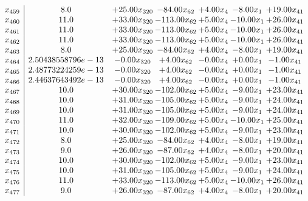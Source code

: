 \documentclass[8pt]{article}
\begin{document}
\[\begin{array}{c| c c@{\hskip 2pt} c@{\hskip 2pt} c@{\hskip 2pt} c@{\hskip 2pt} c@{\hskip 2pt} }
 x_{459}   &  8.0 & + 25.00 x_{320} & -84.00 x_{62} & +  4.00 x_{4} & -8.00 x_{1} & + 19.00 x_{41}\\
 x_{460}   &  11.0 & + 33.00 x_{320} & -113.00 x_{62} & +  5.00 x_{4} & -10.00 x_{1} & + 26.00 x_{41}\\
 x_{461}   &  11.0 & + 33.00 x_{320} & -113.00 x_{62} & +  5.00 x_{4} & -10.00 x_{1} & + 26.00 x_{41}\\
 x_{462}   &  11.0 & + 33.00 x_{320} & -113.00 x_{62} & +  5.00 x_{4} & -10.00 x_{1} & + 26.00 x_{41}\\
 x_{463}   &  8.0 & + 25.00 x_{320} & -84.00 x_{62} & +  4.00 x_{4} & -8.00 x_{1} & + 19.00 x_{41}\\
 x_{464}   &  2.50438558796e-13 & -0.00 x_{320} & +  4.00 x_{62} & -0.00 x_{4} & +  0.00 x_{1} & -1.00 x_{41}\\
 x_{465}   &  2.48773224259e-13 & -0.00 x_{320} & +  4.00 x_{62} & -0.00 x_{4} & +  0.00 x_{1} & -1.00 x_{41}\\
 x_{466}   &  2.44637643492e-13 & -0.00 x_{320} & +  4.00 x_{62} & -0.00 x_{4} & +  0.00 x_{1} & -1.00 x_{41}\\
 x_{467}   &  10.0 & + 30.00 x_{320} & -102.00 x_{62} & +  5.00 x_{4} & -9.00 x_{1} & + 23.00 x_{41}\\
 x_{468}   &  10.0 & + 31.00 x_{320} & -105.00 x_{62} & +  5.00 x_{4} & -9.00 x_{1} & + 24.00 x_{41}\\
 x_{469}   &  10.0 & + 31.00 x_{320} & -105.00 x_{62} & +  5.00 x_{4} & -9.00 x_{1} & + 24.00 x_{41}\\
 x_{470}   &  11.0 & + 32.00 x_{320} & -109.00 x_{62} & +  5.00 x_{4} & -10.00 x_{1} & + 25.00 x_{41}\\
 x_{471}   &  10.0 & + 30.00 x_{320} & -102.00 x_{62} & +  5.00 x_{4} & -9.00 x_{1} & + 23.00 x_{41}\\
 x_{472}   &  8.0 & + 25.00 x_{320} & -84.00 x_{62} & +  4.00 x_{4} & -8.00 x_{1} & + 19.00 x_{41}\\
 x_{473}   &  9.0 & + 26.00 x_{320} & -87.00 x_{62} & +  4.00 x_{4} & -8.00 x_{1} & + 20.00 x_{41}\\
 x_{474}   &  10.0 & + 30.00 x_{320} & -102.00 x_{62} & +  5.00 x_{4} & -9.00 x_{1} & + 23.00 x_{41}\\
 x_{475}   &  10.0 & + 31.00 x_{320} & -105.00 x_{62} & +  5.00 x_{4} & -9.00 x_{1} & + 24.00 x_{41}\\
 x_{476}   &  11.0 & + 33.00 x_{320} & -113.00 x_{62} & +  5.00 x_{4} & -10.00 x_{1} & + 26.00 x_{41}\\
 x_{477}   &  9.0 & + 26.00 x_{320} & -87.00 x_{62} & +  4.00 x_{4} & -8.00 x_{1} & + 20.00 x_{41}\\

\end{array}\]
\end{document}
